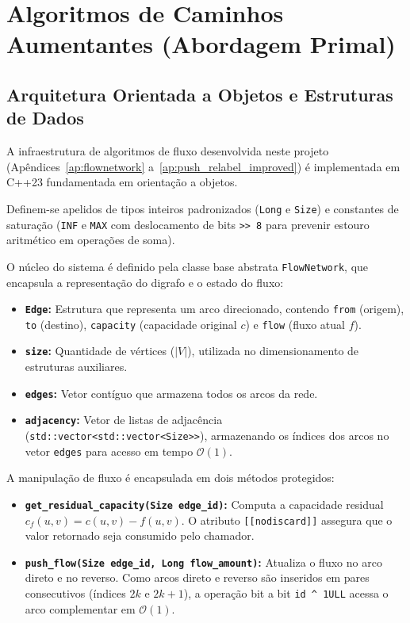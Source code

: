\chapter{Algoritmos de Caminhos Aumentantes (Abordagem Primal)}\label{sec:caminhos_aumentantes}

\section{Arquitetura Orientada a Objetos e Estruturas de Dados}

A infraestrutura de algoritmos de fluxo desenvolvida neste projeto (Apêndices~\ref{ap:flownetwork} a~\ref{ap:push_relabel_improved}) é implementada em C++23 fundamentada em orientação a objetos.

Definem-se apelidos de tipos inteiros padronizados (\lstinline{Long} e \lstinline{Size}) e constantes de saturação (\lstinline{INF} e \lstinline{MAX} com deslocamento de bits \lstinline{>> 8} para prevenir estouro aritmético em operações de soma).

O núcleo do sistema é definido pela classe base abstrata \lstinline{FlowNetwork}, que encapsula a representação do digrafo e o estado do fluxo:

\begin{itemize}
    \item \textbf{\lstinline{Edge}:} Estrutura que representa um arco direcionado, contendo \lstinline{from} (origem), \lstinline{to} (destino), \lstinline{capacity} (capacidade original $c$) e \lstinline{flow} (fluxo atual $f$).
    \item \textbf{\lstinline{size}:} Quantidade de vértices ($|V|$), utilizada no dimensionamento de estruturas auxiliares.
    \item \textbf{\lstinline{edges}:} Vetor contíguo que armazena todos os arcos da rede.
    \item \textbf{\lstinline{adjacency}:} Vetor de listas de adjacência (\lstinline{std::vector<std::vector<Size>>}), armazenando os índices dos arcos no vetor \lstinline{edges} para acesso em tempo $\mathcal{O}(1)$.
\end{itemize}

A manipulação de fluxo é encapsulada em dois métodos protegidos:

\begin{itemize}
    \item \textbf{\lstinline{get_residual_capacity(Size edge_id)}:} Computa a capacidade residual $c_f(u,v) = c(u,v) - f(u,v)$. O atributo \lstinline{[[nodiscard]]} assegura que o valor retornado seja consumido pelo chamador.
    \item \textbf{\lstinline{push_flow(Size edge_id, Long flow_amount)}:} Atualiza o fluxo no arco direto e no reverso. Como arcos direto e reverso são inseridos em pares consecutivos (índices $2k$ e $2k+1$), a operação bit a bit \lstinline{id ^ 1ULL} acessa o arco complementar em $\mathcal{O}(1)$.
\end{itemize}

